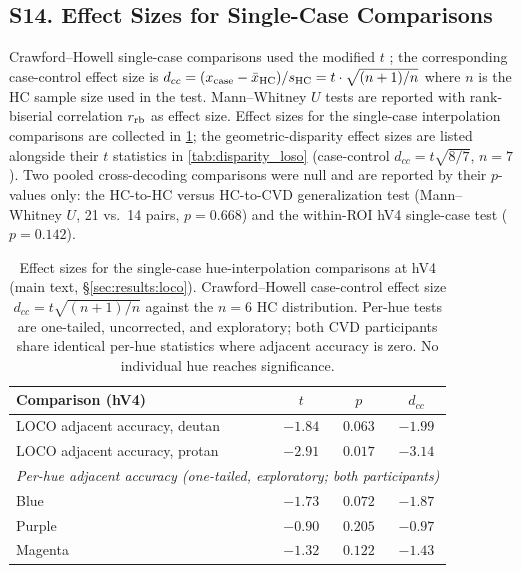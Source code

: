 
\subsection*{\textbf{S14. Effect Sizes for Single-Case Comparisons}}
\label{app:effect_sizes}

Crawford--Howell single-case comparisons used the modified $t$ ; the corresponding case-control effect size is $d_{cc} = (x_{\rm case} - \bar{x}_{\rm HC}) / s_{\rm HC} = t \cdot \sqrt{(n+1)/n}$ where $n$ is the HC sample size used in the test.
Mann--Whitney $U$ tests are reported with rank-biserial correlation $r_{\rm rb}$ as effect size.
Effect sizes for the single-case interpolation comparisons are collected in \cref{tab:effect_sizes}; the geometric-disparity effect sizes are listed alongside their $t$ statistics in \cref{tab:disparity_loso} (case-control $d_{cc} = t\sqrt{8/7}$, $n = 7$). Two pooled cross-decoding comparisons were null and are reported by their $p$-values only: the HC-to-HC versus HC-to-CVD generalization test (Mann--Whitney $U$, 21 vs.\ 14 pairs, $p = 0.668$) and the within-ROI hV4 single-case test ($p = 0.142$).

\begin{table}[h]
\centering
\caption{Effect sizes for the single-case hue-interpolation comparisons at hV4 (main text, \S\ref{sec:results:loco}). Crawford--Howell case-control effect size $d_{cc} = t\sqrt{(n+1)/n}$ against the $n = 6$ HC distribution. Per-hue tests are one-tailed, uncorrected, and exploratory; both CVD participants share identical per-hue statistics where adjacent accuracy is zero. No individual hue reaches significance.}
\label{tab:effect_sizes}
\begin{tabular}{lccc}
\toprule
Comparison (hV4) & $t$ & $p$ & $d_{cc}$ \\
\midrule
LOCO adjacent accuracy, deutan & $-1.84$ & $0.063$ & $-1.99$ \\
LOCO adjacent accuracy, protan & $-2.91$ & $0.017$ & $-3.14$ \\
\midrule
\multicolumn{4}{l}{\emph{Per-hue adjacent accuracy (one-tailed, exploratory; both participants)}} \\
Blue & $-1.73$ & $0.072$ & $-1.87$ \\
Purple & $-0.90$ & $0.205$ & $-0.97$ \\
Magenta & $-1.32$ & $0.122$ & $-1.43$ \\
\bottomrule
\end{tabular}
\end{table}


